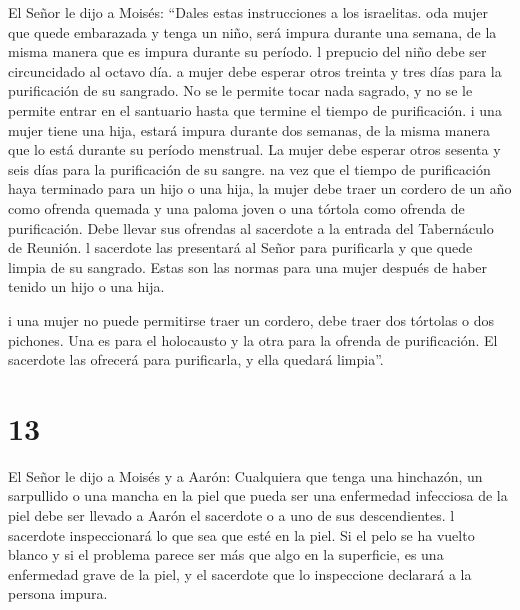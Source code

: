  El Señor le dijo a Moisés: ``Dales estas instrucciones a
los israelitas.  oda mujer que quede embarazada y tenga un
niño, será impura durante una semana, de la misma manera que es impura
durante su período.  l prepucio del niño debe ser
circuncidado al octavo día.  a mujer debe esperar otros
treinta y tres días para la purificación de su sangrado. No se le
permite tocar nada sagrado, y no se le permite entrar en el santuario
hasta que termine el tiempo de purificación.  i una mujer
tiene una hija, estará impura durante dos semanas, de la misma manera
que lo está durante su período menstrual. La mujer debe esperar otros
sesenta y seis días para la purificación de su sangre.  na
vez que el tiempo de purificación haya terminado para un hijo o una
hija, la mujer debe traer un cordero de un año como ofrenda quemada y
una paloma joven o una tórtola como ofrenda de purificación. Debe llevar
sus ofrendas al sacerdote a la entrada del Tabernáculo de Reunión.
 l sacerdote las presentará al Señor para purificarla y que
quede limpia de su sangrado. Estas son las normas para una mujer después
de haber tenido un hijo o una hija.

 i una mujer no puede permitirse traer un cordero, debe
traer dos tórtolas o dos pichones. Una es para el holocausto y la otra
para la ofrenda de purificación. El sacerdote las ofrecerá para
purificarla, y ella quedará limpia''.

\hypertarget{section-12}{%
\section{13}\label{section-12}}

 El Señor le dijo a Moisés y a Aarón: 
Cualquiera que tenga una hinchazón, un sarpullido o una mancha en la
piel que pueda ser una enfermedad infecciosa de la piel debe ser llevado
a Aarón el sacerdote o a uno de sus descendientes.  l
sacerdote inspeccionará lo que sea que esté en la piel. Si el pelo se ha
vuelto blanco y si el problema parece ser más que algo en la superficie,
es una enfermedad grave de la piel, y el sacerdote que lo inspeccione
declarará a la persona impura.

